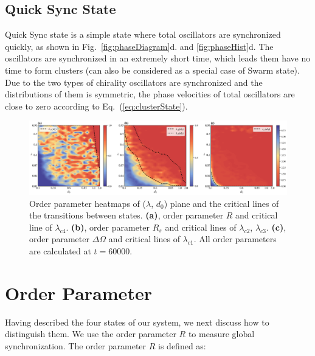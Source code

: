 \documentclass[%
 aip,
 amsmath,amssymb,
 reprint,%
]{revtex4-1}
\begin{document}
\subsection{Quick Sync State}

Quick Sync state is a simple state where total oscillators are synchronized quickly, as shown in Fig.~\ref{fig:phaseDiagram}d. and \ref{fig:phaseHist}d. The oscillators are synchronized in an extremely short time, which leads them have no time to form clusters (can also be considered as a special case of Swarm state). Due to the two types of chirality oscillators are synchronized and the distributions of them is symmetric, the phase velocities of total oscillators are close to zero according to Eq.~(\ref{eq:clusterState}).

\begin{figure}
    \includegraphics[width=\textwidth]{./figs/orderParam.png}
    \caption{
        \label{fig:orderParam} Order parameter heatmaps of ($\lambda$, $d_0$) plane and the critical lines of the transitions between states.
        \textbf{(a)}, order parameter $R$ and critical line of $\lambda_{c4}$.
        \textbf{(b)}, order parameter $R_s$ and critical lines of $\lambda_{c2}$, $\lambda_{c3}$.
        \textbf{(c)}, order parameter $\Delta \Omega$ and critical lines of $\lambda_{c1}$.
        All order parameters are calculated at $t=60000$.
    }
\end{figure}

\section{Order Parameter}

Having described the four states of our system, we next discuss how to distinguish them. We use the order parameter $R$ to measure global synchronization. The order parameter $R$ is defined as:
\end{document}
